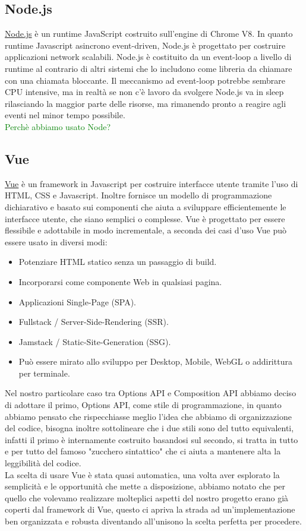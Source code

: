 \documentclass{article}
\newcommand{\node}{\href{https://nodejs.org/it/}{Node.js} }
\newcommand{\vue}{\href{https://vuejs.org/}{Vue} }
\begin{document}
\subsection{Node.js}
\node è un runtime JavaScript costruito sull'engine di Chrome V8. In quanto runtime Javascript asincrono event-driven, Node.js è progettato per costruire applicazioni network scalabili. Node.js è costituito da un event-loop a livello di runtime al contrario di altri sistemi che lo includono come libreria da chiamare con una chiamata bloccante. Il meccanismo ad event-loop potrebbe sembrare CPU intensive, ma in realtà se non c'è lavoro da svolgere Node.js va in sleep rilasciando la maggior parte delle risorse, ma rimanendo pronto a reagire agli eventi nel minor tempo possibile.
\\
\textcolor{green}{Perchè abbiamo usato Node?}

\subsection{Vue}
\vue è un framework in Javascript per costruire interfacce utente tramite l'uso di HTML, CSS e Javascript. Inoltre fornisce un modello di programmazione dichiarativo e basato sui componenti che aiuta a sviluppare efficientemente le interfacce utente, che siano semplici o complesse. Vue è progettato per essere flessibile e adottabile in modo incrementale, a seconda dei casi d'uso Vue può essere usato in diversi modi:
\begin{itemize}
	\item Potenziare HTML statico senza un passaggio di build.
	\item Incorporarsi come componente Web in qualsiasi pagina.
	\item Applicazioni Single-Page (SPA).
	\item Fullstack / Server-Side-Rendering (SSR).
	\item Jamstack / Static-Site-Generation (SSG).
	\item Può essere mirato allo sviluppo per Desktop, Mobile, WebGL o addirittura per terminale.
\end{itemize}
Nel nostro particolare caso tra Options API e Composition API abbiamo deciso di adottare il primo, Options API, come stile di programmazione, in quanto abbiamo pensato che rispecchiasse meglio l'idea che abbiamo di organizzazione del codice, bisogna inoltre sottolineare che i due stili sono del tutto equivalenti, infatti il primo è internamente costruito basandosi sul secondo, si tratta in tutto e per tutto del famoso "zucchero sintattico" che ci aiuta a mantenere alta la leggibilità del codice.\\
La scelta di usare Vue è stata quasi automatica, una volta aver esplorato la semplicità e le opportunità che mette a disposizione, abbiamo notato che per quello che volevamo realizzare molteplici aspetti del nostro progetto erano già coperti dal framework di Vue, questo ci apriva la strada ad un'implementazione ben organizzata e robusta diventando all'unisono la scelta perfetta per procedere.
\end{document}
